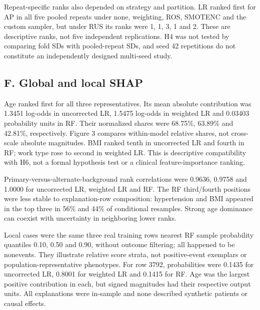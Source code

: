 \documentclass[10pt,twocolumn,letterpaper]{article}
\begin{document}
Repeat-specific ranks also depended on strategy and partition. LR ranked first for AP in all five pooled repeats under none, weighting, ROS, SMOTENC and the custom sampler, but under RUS its ranks were 1, 1, 3, 1 and 2. These are descriptive ranks, not five independent replications. H4 was not tested by comparing fold SDs with pooled-repeat SDs, and seed 42 repetitions do not constitute an independently designed multi-seed study.


\subsection*{F. Global and local SHAP}
Age ranked first for all three representatives. Its mean absolute contribution was 1.3451 log-odds in uncorrected LR, 1.5475 log-odds in weighted LR and 0.03403 probability units in RF. Their normalized shares were 68.75\%, 63.89\% and 42.81\%, respectively. Figure 3 compares within-model relative shares, not cross-scale absolute magnitudes. BMI ranked tenth in uncorrected LR and fourth in RF; work type rose to second in weighted LR. This is descriptive compatibility with H6, not a formal hypothesis test or a clinical feature-importance ranking.


Primary-versus-alternate-background rank correlations were 0.9636, 0.9758 and 1.0000 for uncorrected LR, weighted LR and RF. The RF third/fourth positions were less stable to explanation-row composition: hypertension and BMI appeared in the top three in 56\% and 44\% of conditional resamples. Strong age dominance can coexist with uncertainty in neighboring lower ranks.


Local cases were the same three real training rows nearest RF sample probability quantiles 0.10, 0.50 and 0.90, without outcome filtering; all happened to be nonevents. They illustrate relative score strata, not positive-event exemplars or population-representative phenotypes. For row 3792, probabilities were 0.1435 for uncorrected LR, 0.8001 for weighted LR and 0.1415 for RF. Age was the largest positive contribution in each, but signed magnitudes had their respective output units. All explanations were in-sample and none described synthetic patients or causal effects.
\end{document}
